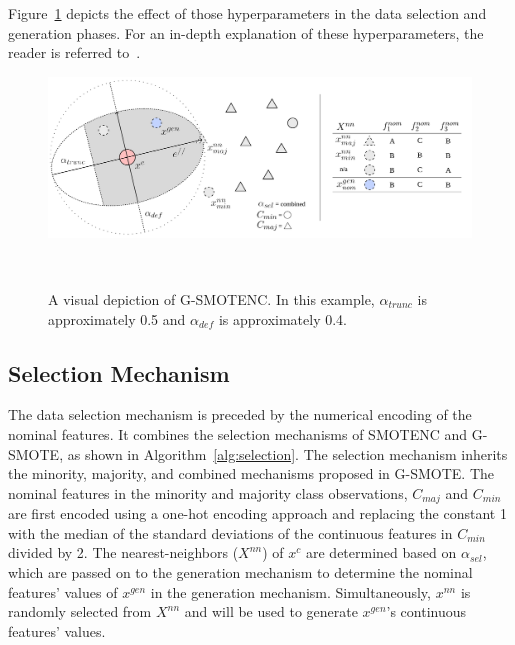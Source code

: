 Figure~\ref{fig:gsmote} depicts the effect of those hyperparameters in the
data selection and generation phases. For an in-depth explanation of these
hyperparameters, the reader is referred to~\cite{Douzas2019}.

\begin{figure}
	\centering
	\includegraphics[width=\linewidth]{g-smote}
    \caption{A visual depiction of G-SMOTENC. In this example,
        $\alpha_{trunc}$ is approximately 0.5 and $\alpha_{def}$ is
        approximately 0.4.
    }~\label{fig:gsmote}
\end{figure}

\subsection{Selection Mechanism}

The data selection mechanism is preceded by the numerical encoding of the
nominal features. It combines the selection mechanisms of SMOTENC and
G-SMOTE, as shown in Algorithm~\ref{alg:selection}. The selection mechanism
inherits the minority, majority, and combined mechanisms proposed in G-SMOTE.
The nominal features in the minority and majority class observations,
$C_{maj}$ and $C_{min}$ are first encoded using a one-hot encoding approach
and replacing the constant 1 with the median of the standard deviations of the
continuous features in $C_{min}$ divided by 2. The nearest-neighbors
($X^{nn}$) of $x^c$ are determined based on $\alpha_{sel}$, which are passed
on to the generation mechanism to determine the nominal features' values of
$x^{gen}$ in the generation mechanism. Simultaneously, $x^{nn}$ is randomly
selected from $X^{nn}$ and will be used to generate $x^{gen}$'s continuous
features' values.


